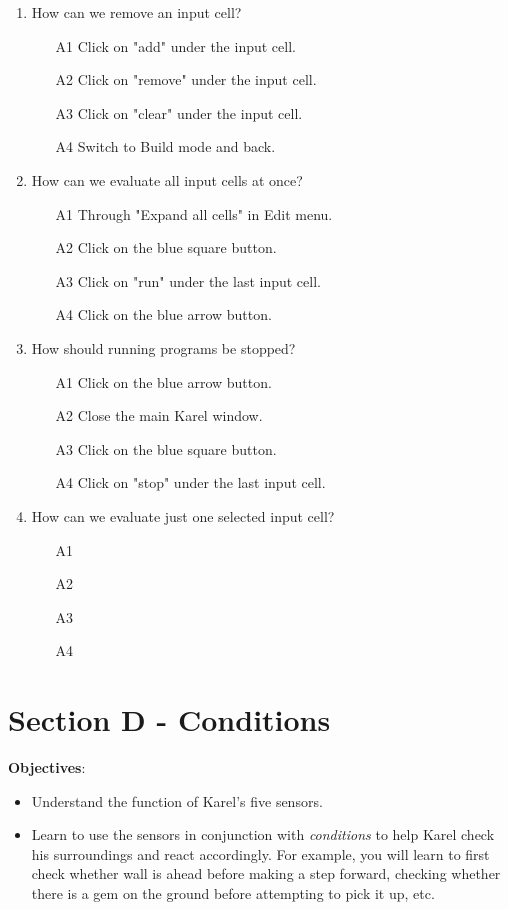 \documentclass[article,A4,12pt]{llncs}
\begin{document}
\begin{enumerate}
\begin{enumerate}
\end{enumerate}
\item How can we remove an input cell?
\begin{enumerate}
\item[A1] Click on "add" under the input cell.
\item[A2] Click on "remove" under the input cell.
\item[A3] Click on "clear" under the input cell.
\item[A4] Switch to Build mode and back.
\end{enumerate}
\item How can we evaluate all input cells at once?
\begin{enumerate}
\item[A1] Through "Expand all cells" in Edit menu.
\item[A2] Click on the blue square button.
\item[A3] Click on "run" under the last input cell.
\item[A4] Click on the blue arrow button.
\end{enumerate}
\item How should running programs be stopped?
\begin{enumerate}
\item[A1] Click on the blue arrow button.
\item[A2] Close the main Karel window.
\item[A3] Click on the blue square button.
\item[A4] Click on "stop" under the last input cell.
\end{enumerate}
\item How can we evaluate just one selected input cell?
\begin{enumerate}
\item[A1] 
\item[A2] 
\item[A3] 
\item[A4] 
\end{enumerate}
\end{enumerate}




\section{Section D - Conditions}

\noindent
{\bf Objectives}: 
\begin{itemize}
\item Understand the function of Karel's five sensors.
\item Learn to use the sensors in conjunction with {\em conditions} to help Karel 
      check his surroundings and react accordingly. For example, you will learn to first 
      check whether wall is ahead before making a step forward, checking whether there
      is a gem on the ground before attempting to pick it up, etc.
\end{itemize}
\end{document}
